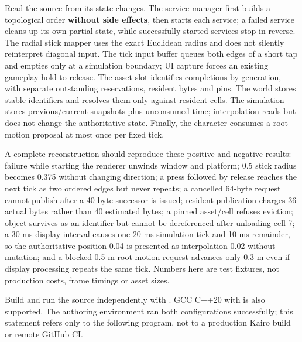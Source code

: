 Read the source from its state changes. The service manager first builds a topological order \textbf{without side effects}, then starts each service; a failed service cleans up its own partial state, while successfully started services stop in reverse. The radial stick mapper uses the exact Euclidean radius and does not silently reinterpret diagonal input. The tick input buffer queues both edges of a short tap and empties only at a simulation boundary; UI capture forces an existing gameplay hold to release. The asset slot identifies completions by generation, with separate outstanding reservations, resident bytes and pins. The world stores stable  identifiers and resolves them only against resident cells. The simulation stores previous/current snapshots plus unconsumed time; interpolation reads but does not change the authoritative state. Finally, the character consumes a root-motion proposal at most once per fixed tick.

A complete reconstruction should reproduce these positive and negative results: failure while starting the renderer unwinds window and platform; 0.5 stick radius becomes 0.375 without changing direction; a press followed by release reaches the next tick as two ordered edges but never repeats; a cancelled 64-byte request cannot publish after a 40-byte successor is issued; resident publication charges 36 actual bytes rather than 40 estimated bytes; a pinned asset/cell refuses eviction; object  survives as an identifier but cannot be dereferenced after unloading cell 7; a 30 ms display interval causes one 20 ms simulation tick and 10 ms remainder, so the authoritative position 0.04 is presented as interpolation 0.02 without mutation; and a blocked 0.5 m root-motion request advances only 0.3 m even if display processing repeats the same tick. Numbers here are test fixtures, not production costs, frame timings or asset sizes.

Build and run the source independently with . GCC C++20 with  is also supported. The authoring environment ran both configurations successfully; this statement refers only to the following program, not to a production Kairo build or remote GitHub CI.


